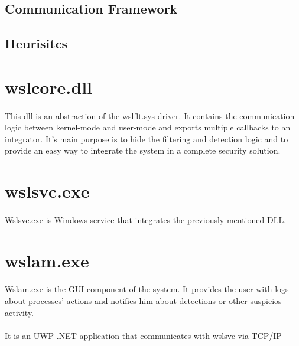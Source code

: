         \subsection{Communication Framework}
            \paragraph{}
        \subsection{Heurisitcs}
        \paragraph{}
    \section{wslcore.dll}
        \paragraph{}
        This dll is an abstraction of the wslflt.sys driver. It contains the communication logic between kernel-mode and user-mode and exports
        multiple callbacks to an integrator. It's main purpose is to hide the filtering and detection logic and to provide an easy way to integrate
        the system in a complete security solution.
        \paragraph{}
    \section{wslsvc.exe}
        \paragraph{}
        Wslsvc.exe is Windows service that integrates the previously mentioned DLL.
    \section{wslam.exe}
        \paragraph{}
        Wslam.exe is the GUI component of the system. It provides the user with logs about processes' actions and notifies him about detections
        or other suspicios activity.
        \paragraph{}
        It is an UWP .NET application that communicates with wslsvc via TCP/IP
